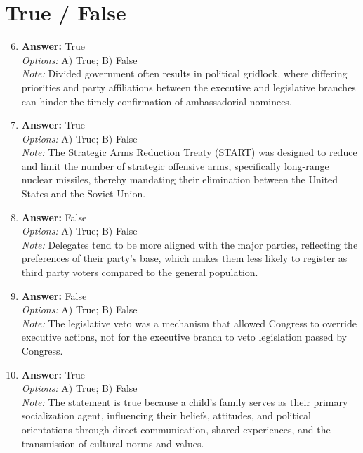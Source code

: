 \documentclass[12pt]{article}
\begin{document}
\section*{True / False}
\begin{enumerate}[label=\arabic*.]
\setcounter{enumi}{5}
\item \textbf{Answer:} True
\\ \textit{Options:} A) True; B) False
\\ \textit{Note:} Divided government often results in political gridlock, where differing priorities and party affiliations between the executive and legislative branches can hinder the timely confirmation of ambassadorial nominees.
\item \textbf{Answer:} True
\\ \textit{Options:} A) True; B) False
\\ \textit{Note:} The Strategic Arms Reduction Treaty (START) was designed to reduce and limit the number of strategic offensive arms, specifically long-range nuclear missiles, thereby mandating their elimination between the United States and the Soviet Union.
\item \textbf{Answer:} False
\\ \textit{Options:} A) True; B) False
\\ \textit{Note:} Delegates tend to be more aligned with the major parties, reflecting the preferences of their party's base, which makes them less likely to register as third party voters compared to the general population.
\item \textbf{Answer:} False
\\ \textit{Options:} A) True; B) False
\\ \textit{Note:} The legislative veto was a mechanism that allowed Congress to override executive actions, not for the executive branch to veto legislation passed by Congress.
\item \textbf{Answer:} True
\\ \textit{Options:} A) True; B) False
\\ \textit{Note:} The statement is true because a child's family serves as their primary socialization agent, influencing their beliefs, attitudes, and political orientations through direct communication, shared experiences, and the transmission of cultural norms and values.
\end{enumerate}
\end{document}
